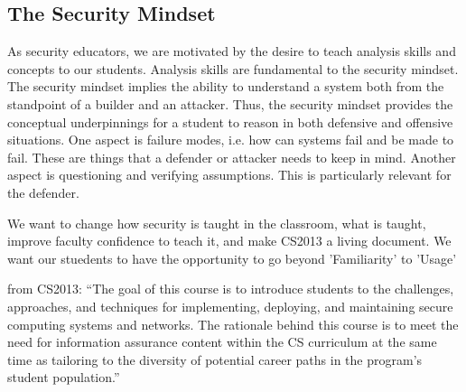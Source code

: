 \subsection{The Security Mindset}
As security educators, we are motivated by the desire to teach analysis skills and concepts
to our students.
Analysis skills are fundamental to the security mindset.  The security
mindset implies the ability to understand a system both from the
standpoint of a builder and an attacker.  Thus, the security mindset
provides the conceptual underpinnings for a student to reason in both
defensive and offensive situations.  One aspect is failure modes,
i.e. how can systems fail and be made to fail.  These are things that
a defender or attacker needs to keep in mind.  Another aspect is
questioning and verifying assumptions.  This is particularly relevant
for the defender.

We want to change how security is taught in the classroom, what is taught, improve 
faculty confidence to teach it, and make CS2013 a living document.  We want our stuedents to 
have the opportunity to go beyond 
'Familiarity' to 'Usage'


from CS2013: ``The goal of this course is to introduce students to the challenges, approaches, and techniques 
for implementing, deploying, and maintaining secure computing systems and networks. The rationale behind this 
course is to meet the
need for information assurance content within the CS curriculum at the same time as tailoring to the diversity of
potential career paths in the program's student population.''
